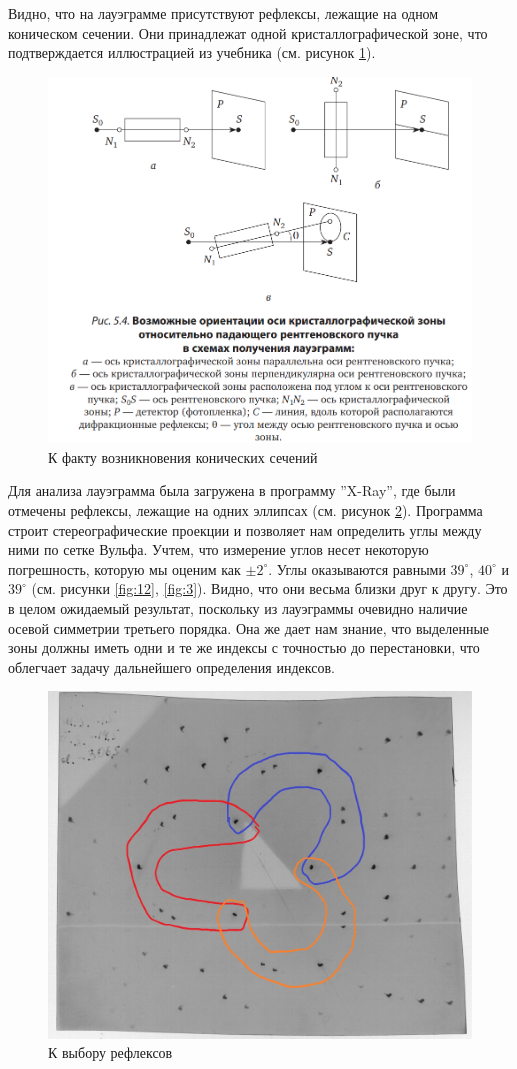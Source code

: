 \documentclass[a4paper, 12pt]{article}
\begin{document}
Видно, что на лауэграмме присутствуют рефлексы, лежащие на одном коническом сечении. Они принадлежат одной кристаллографической зоне, что подтверждается иллюстрацией из учебника \cite{Uchebnik} (см. рисунок \ref{fig:proof}).

\begin{figure}[H]
	\centering
	\includegraphics[width=0.5\linewidth]{proof}
	\caption{К факту возникновения конических сечений}
	\label{fig:proof}
\end{figure}

Для анализа лауэграмма была загружена в программу ''X-Ray'', где были отмечены рефлексы, лежащие на одних эллипсах (см. рисунок \ref{fig:incoming_enh}). Программа строит стереографические проекции и позволяет нам определить углы между ними по сетке Вульфа. Учтем, что измерение углов несет некоторую погрешность, которую мы оценим как $\pm 2^\circ$. Углы оказываются равными $39^\circ$, $40^\circ$ и $39^\circ$ (см. рисунки \ref{fig:12}, \ref{fig:3}). Видно, что они весьма близки друг к другу. Это в целом ожидаемый результат, поскольку из лауэграммы очевидно наличие осевой симметрии третьего порядка. Она же дает нам знание, что выделенные зоны должны иметь одни и те же индексы с точностью до перестановки, что облегчает задачу дальнейшего определения индексов.

\begin{figure}[H]
	\centering
	\includegraphics[width=0.7\linewidth]{Incoming_enh}
	\caption{К выбору рефлексов}
	\label{fig:incoming_enh}
\end{figure}
\end{document}
